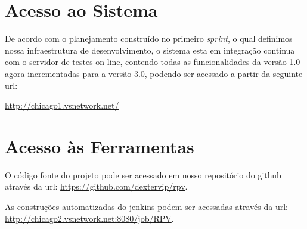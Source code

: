 \documentclass{abnt}
\begin{document}
		 		 
\clearpage
	\section{Acesso ao Sistema}
			De acordo com o planejamento construído no primeiro \emph{sprint}, o qual definimos nossa infraestrutura de desenvolvimento, 
			o sistema esta em integração contínua com o servidor de testes on-line, contendo todas as funcionalidades da versão 1.0 agora incrementadas para a versão 3.0, 
			podendo ser acessado a partir da seguinte url:
		
			\url{http://chicago1.vsnetwork.net/}
			
			
			

	\section{Acesso às Ferramentas}
		
		O código fonte do projeto pode ser acessado em nosso repositório do github\cite{GITHUB} através da url: \url{https://github.com/dextervip/rpv}. 
		
		As construções automatizadas do jenkins podem ser acessadas através da url: \url{http://chicago2.vsnetwork.net:8080/job/RPV}.

	\clearpage

	\nocite{*}
	
			
\end{document}
